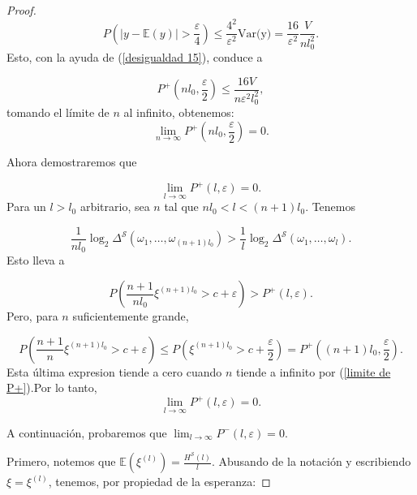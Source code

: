 \documentclass{report}
\begin{document}
\begin{proof}
    \[P\left( |y - \mathbb{E}(y)| > \frac{\varepsilon}{4} \right) \leq \frac{4^2}{\varepsilon^2}\text{Var(y)} =  \frac{16}{\varepsilon^2}\frac{V}{n l_0^2}.\]
    Esto, con la ayuda de (\ref{desigualdad 15}), conduce a

    \[
    P^+\left(n l_0, \frac{\varepsilon}{2} \right)
    \leq \frac{16V}{n \varepsilon^2 l_0^2},
    \]
    tomando el límite de $n$ al infinito, obtenemos:
    \begin{equation}\label{limite de P+}
        \lim_{n \to \infty} P^+\left(n l_0, \frac{\varepsilon}{2} \right) = 0.
    \end{equation}
\bigskip

    Ahora demostraremos que

    \[
    \lim_{l \to \infty} P^+(l, \varepsilon) = 0.
    \]
    Para un \( l > l_0 \) arbitrario, sea \( n \) tal que \( n l_0 < l < (n+1)l_0 \). Tenemos

    \[
    \frac{1}{n l_0} \log_2 \Delta^{\mathcal{S}}(\omega_1, \dots, \omega_{(n+1)l_0}) > \frac{1}{l} \log_2 \Delta^{\mathcal{S}}(\omega_1, \dots, \omega_l).
    \]
    Esto lleva a

    \[
    P\left( \frac{n+1}{n l_0} \xi^{(n+1)l_0} > c + \varepsilon \right) > P^+(l, \varepsilon).
    \]
    Pero, para \( n \) suficientemente grande,

    \[
    P\left( \frac{n+1}{n} \xi^{(n+1)l_0} > c + \varepsilon \right)
    \leq P\left( \xi^{(n+1)l_0} > c + \frac{\varepsilon}{2} \right)
    = P^+\left( (n+1)l_0, \frac{\varepsilon}{2} \right).
    \]
    Esta última expresion tiende a cero cuando $n$ tiende a infinito por (\ref{limite de P+}).Por lo tanto,
    \begin{equation}\label{eq 16}
    \lim_{l \to \infty} P^+(l, \varepsilon) = 0.
    \end{equation}
    \bigskip

    A continuación, probaremos que \( \lim_{l \to \infty} P^-(l, \varepsilon) = 0\).

    Primero, notemos que \( \mathbb{E} (\xi^{(l)}) = \frac{H^{\mathcal{S}}(l)}{l} \). Abusando de la notación y escribiendo
    $\xi=\xi^{(l)}$, tenemos, por propiedad de la esperanza:


\end{proof}
\end{document}
